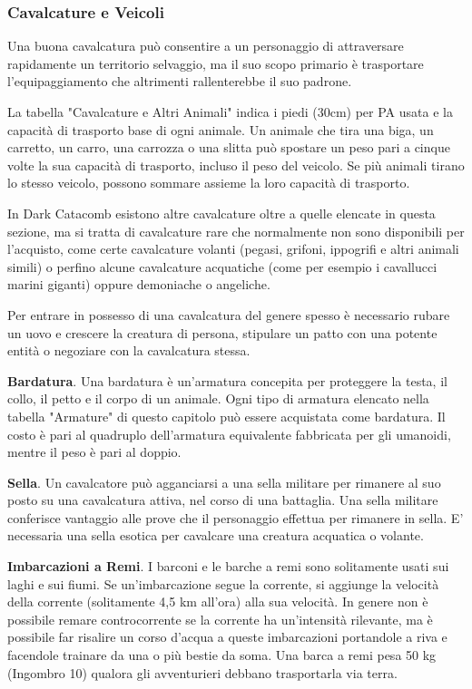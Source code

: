 \documentclass[12pt,a4paper,twoside,openany]{book}
\begin{document}
\begin{multicols}{2}

\subsubsection{Cavalcature e Veicoli}

Una buona cavalcatura può consentire a un personaggio di attraversare rapidamente un territorio selvaggio, ma il suo scopo primario è trasportare l'equipaggiamento che altrimenti rallenterebbe il suo padrone.

La tabella "Cavalcature e Altri Animali" indica i piedi (30cm) per PA usata e la capacità di trasporto base di ogni animale. Un animale che tira una biga, un carretto, un carro, una carrozza o una slitta può spostare un peso pari a cinque volte la sua capacità di trasporto, incluso il peso del veicolo. Se più animali tirano lo stesso veicolo, possono sommare assieme la loro capacità di trasporto.

In Dark Catacomb esistono altre cavalcature oltre a quelle elencate in questa sezione, ma si tratta di cavalcature rare che normalmente non sono disponibili per l'acquisto, come certe cavalcature volanti (pegasi, grifoni, ippogrifi e altri animali simili) o perfino alcune cavalcature acquatiche (come per esempio i cavallucci marini giganti) oppure demoniache o angeliche.

Per entrare in possesso di una cavalcatura del genere spesso è necessario rubare un uovo e crescere la creatura di persona, stipulare un patto con una potente entità o negoziare con la cavalcatura stessa.

\textbf{Bardatura}. Una bardatura è un'armatura concepita per proteggere la testa, il collo, il petto e il corpo di un animale. Ogni tipo di armatura elencato nella tabella "Armature" di questo capitolo può essere acquistata come bardatura. Il costo è pari al quadruplo dell'armatura equivalente fabbricata per gli umanoidi, mentre il peso è pari al doppio.

\textbf{Sella}. Un cavalcatore può agganciarsi a una sella militare per rimanere al suo posto su una cavalcatura attiva, nel corso di una battaglia. Una sella militare conferisce vantaggio alle prove che il personaggio effettua per rimanere in sella. E' necessaria una sella esotica per cavalcare una creatura acquatica o volante.

\textbf{Imbarcazioni a Remi}. I barconi e le barche a remi sono solitamente usati sui laghi e sui fiumi. Se un'imbarcazione segue la corrente, si aggiunge la velocità della corrente (solitamente 4,5 km all'ora) alla sua velocità. In genere non è possibile remare controcorrente se la corrente ha un'intensità rilevante, ma è possibile far risalire un corso d'acqua a queste imbarcazioni portandole a riva e facendole trainare da una o più bestie da soma. Una barca a remi pesa 50 kg (Ingombro 10) qualora gli avventurieri debbano trasportarla via terra.

\end{multicols}
\end{document}
